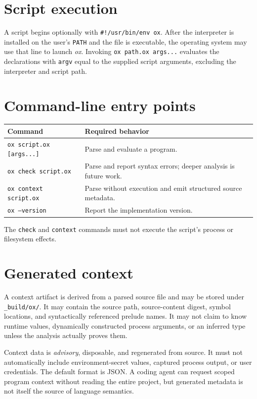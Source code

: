 \documentclass[11pt,oneside,openany]{book}
\newcommand{\ox}{\textit{ox}}
\newcommand{\kw}[1]{\texttt{#1}}
\begin{document}
\section{Script execution}
A script begins optionally with \kw{\#!/usr/bin/env ox}. After the interpreter is installed on the user's \kw{PATH} and the file is executable, the operating system may use that line to launch \ox{}. Invoking \kw{ox path.ox args...} evaluates the declarations with \kw{argv} equal to the supplied script arguments, excluding the interpreter and script path.

\section{Command-line entry points}
\begin{center}
\begin{tabularx}{\linewidth}{@{}l X@{}}
\toprule
Command & Required behavior \\
\midrule
\kw{ox script.ox [args...]} & Parse and evaluate a program. \\
\kw{ox check script.ox} & Parse and report syntax errors; deeper analysis is future work. \\
\kw{ox context script.ox} & Parse without execution and emit structured source metadata. \\
\kw{ox --version} & Report the implementation version. \\
\bottomrule
\end{tabularx}
\end{center}
The \kw{check} and \kw{context} commands must not execute the script's process or filesystem effects.

\section{Generated context}
A context artifact is derived from a parsed source file and may be stored under \kw{\_build/ox/}. It may contain the source path, source-content digest, symbol locations, and syntactically referenced prelude names. It may not claim to know runtime values, dynamically constructed process arguments, or an inferred type unless the analysis actually proves them.

Context data is \emph{advisory}, disposable, and regenerated from source. It must not automatically include environment-secret values, captured process output, or user credentials. The default format is JSON. A coding agent can request scoped program context without reading the entire project, but generated metadata is not itself the source of language semantics.
\end{document}
